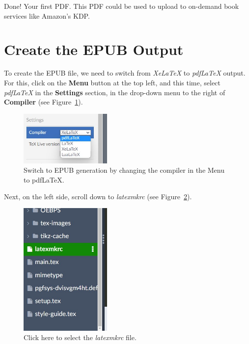 Done! Your first PDF. This PDF could be used to upload to on-demand book services like Amazon's KDP.


\section{Create the EPUB Output}\label{createhtmlloutput:sec}

To create the EPUB file, we need to switch from \textit{XeLaTeX} to \textit{pdfLaTeX} output. For this, click on the \textbf{Menu} button at the top left, and this time, select \textit{pdfLaTeX} in the \textbf{Settings} section, in the drop-down menu to the right of \textbf{Compiler} (see Figure~\ref{switchpdflatex:fig}).



\begin{figure}[H]\centering
\includegraphics[width=0.4\textwidth]{images/switchpdflatex.jpg}
\caption{Switch to EPUB generation by changing the compiler in the Menu to pdfLaTeX.}
\label{switchpdflatex:fig}
\end{figure}

Next, on the left side, scroll down to \textit{latexmkrc} (see Figure~\ref{latexmkrc:fig}).

\begin{figure}[H]\centering
\includegraphics[width=0.4\textwidth]{images/latexmkrc.jpg}
\caption{Click here to select the \textit{latexmkrc} file.}
\label{latexmkrc:fig}
\end{figure}

